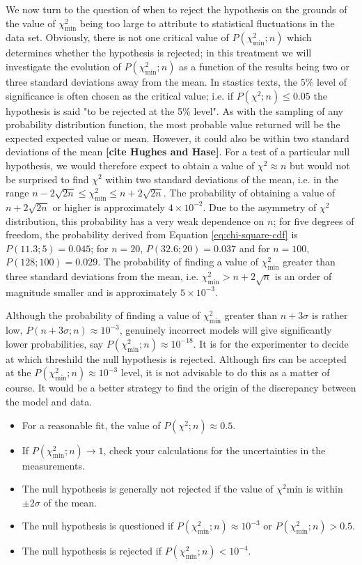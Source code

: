 We now turn to the question of when to reject the hypothesis on the grounds of the value of $\chi^2_\mathrm{min}$ being too large to attribute to statistical fluctuations in the data set. Obviously, there is not one critical value of $P(\chi^2_\mathrm{min};n)$ which determines whether the hypothesis is rejected; in this treatment we will investigate the evolution of $P(\chi^2_\mathrm{min};n)$ as a function of the results being two or three standard deviations away from the mean. In stastics texts, the $5\%$ level of significance is often chosen as the critical value; i.e. if $P(\chi^2;n)\leq0.05$ the hypothesis is said "to be rejected at the 5\% level". As with the sampling of any probability distribution function, the most probable value returned will be the expected expected value or mean. However, it could also be within two standard deviations of the mean \textbf{[cite Hughes and Hase]}. For a test of a particular null hypothesis, we would therefore expect to obtain a value of $\chi^2 \approx n$ but would not be surprised to find $\chi^2$ within two standard deviations of the mean, i.e. in the range $n - 2\sqrt{2n} \leq \chi^2_\mathrm{min}\leq n + 2\sqrt{2n}$. The probability of obtaining a value of $n + 2\sqrt{2n}$ or higher is approximately $4\times10^{-2}$. Due to the asymmetry of $\chi^2$ distribution, this probability has a very weak dependence on $n$; for five degrees of freedom, the probability derived from Equation \ref{eq:chi-square-cdf} is $P(11.3;5) = 0.045$; for $n=20$, $P(32.6;20)=0.037$ and for $n=100$, $P(128;100)=0.029$. The probability of finding a value of $\chi^2_\mathrm{min}$ greater than three standard deviations from the mean, i.e. $\chi^2_\mathrm{min}>n+2\sqrt{n}$ is an order of magnitude smaller and is approximately $5\times10^{-3}$.

Although the probability of finding a value of $\chi^2_\mathrm{min}$ greater than $n+3\sigma$ is rather low, $P(n+3\sigma;n)\approx10^{-3}$, genuinely incorrect models will give significantly lower probabilities, say $P(\chi^2_\mathrm{min};n)\approx10^{-18}$. It is for the experimenter to decide at which  threshild the null hypothesis is rejected. Although firs can be accepted at the $P(\chi^2_\mathrm{min};n)\approx10^{-3}$ level, it is not advisable to do this as a matter of course. It would be a better strategy to find the origin of the discrepancy between the model and data.

\begin{itemize}
	\item For a reasonable fit, the value of $P(\chi^2;n)\approx0.5$.
	\item If $P(\chi^2_\mathrm{min};n)\rightarrow1$, check your calculations for the uncertainties in the measurements.
	\item The null hypothesis is generally not rejected if the value of $\chi^2\mathrm{min}$ is within $\pm 2\sigma$ of the mean.
	\item The null hypothesis is questioned if $P(\chi^2_\mathrm{min};n)\approx10^{-3}$ or $P(\chi^2_\mathrm{min};n)>0.5$.
	\item The null hypothesis is rejected if $P(\chi^2_\mathrm{min};n)<10^{-4}$.
\end{itemize}

